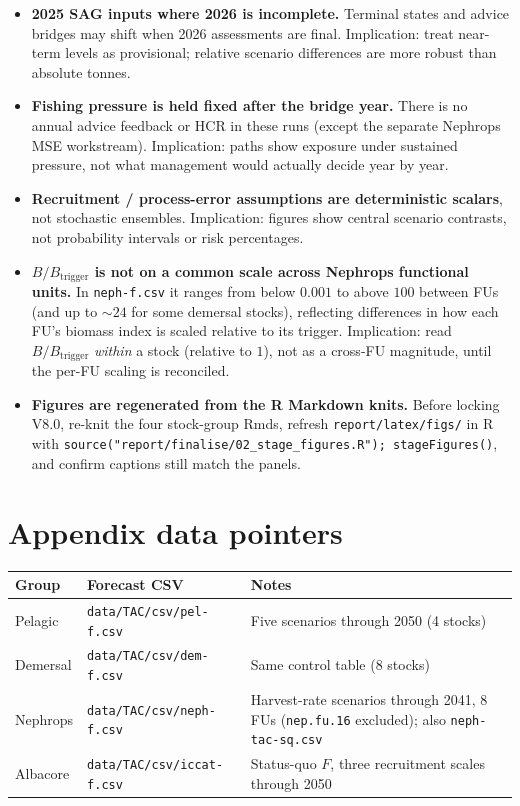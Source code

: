 \begin{itemize}
  \item \textbf{2025 SAG inputs where 2026 is incomplete.}
        Terminal states and advice bridges may shift when 2026 assessments
        are final. Implication: treat near-term levels as provisional; relative
        scenario differences are more robust than absolute tonnes.
  \item \textbf{Fishing pressure is held fixed after the bridge year.}
        There is no annual advice feedback or HCR in these runs (except the
        separate Nephrops MSE workstream). Implication: paths show exposure
        under sustained pressure, not what management would actually decide
        year by year.
  \item \textbf{Recruitment / process-error assumptions are deterministic
        scalars}, not stochastic ensembles. Implication: figures show central
        scenario contrasts, not probability intervals or risk percentages.
  \item \textbf{$B/B_{\mathrm{trigger}}$ is not on a common scale across
        Nephrops functional units.} In \texttt{neph-f.csv} it ranges from below
        $0.001$ to above $100$ between FUs (and up to $\sim 24$ for some
        demersal stocks), reflecting differences in how each FU's biomass index
        is scaled relative to its trigger. Implication: read
        $B/B_{\mathrm{trigger}}$ \emph{within} a stock (relative to $1$), not as
        a cross-FU magnitude, until the per-FU scaling is reconciled.
  \item \textbf{Figures are regenerated from the R Markdown knits.}
        Before locking V8.0, re-knit the four stock-group Rmds, refresh
        \texttt{report/latex/figs/} in R with
        \texttt{source("report/finalise/02\_stage\_figures.R"); stageFigures()},
        and confirm captions still match the panels.
\end{itemize}

\section*{Appendix data pointers}

\begin{center}
\begin{tabular}{@{}llp{}@{}}
\toprule
Group & Forecast CSV & Notes \\
\midrule
Pelagic  & \texttt{data/TAC/csv/pel-f.csv}   & Five scenarios through 2050 (4 stocks) \\
Demersal & \texttt{data/TAC/csv/dem-f.csv}   & Same control table (8 stocks) \\
Nephrops & \texttt{data/TAC/csv/neph-f.csv}  & Harvest-rate scenarios through 2041, 8 FUs (\texttt{nep.fu.16} excluded); also \texttt{neph-tac-sq.csv} \\
Albacore & \texttt{data/TAC/csv/iccat-f.csv} & Status-quo $F$, three recruitment scales through 2050 \\
\bottomrule
\end{tabular}
\end{center}
